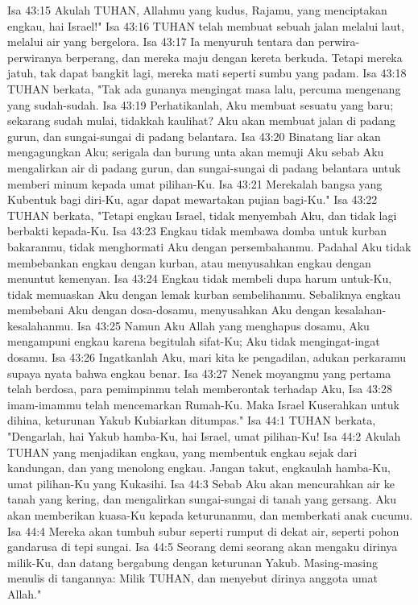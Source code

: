 Isa 43:15  Akulah TUHAN, Allahmu yang kudus, Rajamu, yang menciptakan engkau, hai Israel!"
Isa 43:16  TUHAN telah membuat sebuah jalan melalui laut, melalui air yang bergelora.
Isa 43:17  Ia menyuruh tentara dan perwira-perwiranya berperang, dan mereka maju dengan kereta berkuda. Tetapi mereka jatuh, tak dapat bangkit lagi, mereka mati seperti sumbu yang padam.
Isa 43:18  TUHAN berkata, "Tak ada gunanya mengingat masa lalu, percuma mengenang yang sudah-sudah.
Isa 43:19  Perhatikanlah, Aku membuat sesuatu yang baru; sekarang sudah mulai, tidakkah kaulihat? Aku akan membuat jalan di padang gurun, dan sungai-sungai di padang belantara.
Isa 43:20  Binatang liar akan mengagungkan Aku; serigala dan burung unta akan memuji Aku sebab Aku mengalirkan air di padang gurun, dan sungai-sungai di padang belantara untuk memberi minum kepada umat pilihan-Ku.
Isa 43:21  Merekalah bangsa yang Kubentuk bagi diri-Ku, agar dapat mewartakan pujian bagi-Ku."
Isa 43:22  TUHAN berkata, "Tetapi engkau Israel, tidak menyembah Aku, dan tidak lagi berbakti kepada-Ku.
Isa 43:23  Engkau tidak membawa domba untuk kurban bakaranmu, tidak menghormati Aku dengan persembahanmu. Padahal Aku tidak membebankan engkau dengan kurban, atau menyusahkan engkau dengan menuntut kemenyan.
Isa 43:24  Engkau tidak membeli dupa harum untuk-Ku, tidak memuaskan Aku dengan lemak kurban sembelihanmu. Sebaliknya engkau membebani Aku dengan dosa-dosamu, menyusahkan Aku dengan kesalahan-kesalahanmu.
Isa 43:25  Namun Aku Allah yang menghapus dosamu, Aku mengampuni engkau karena begitulah sifat-Ku; Aku tidak mengingat-ingat dosamu.
Isa 43:26  Ingatkanlah Aku, mari kita ke pengadilan, adukan perkaramu supaya nyata bahwa engkau benar.
Isa 43:27  Nenek moyangmu yang pertama telah berdosa, para pemimpinmu telah memberontak terhadap Aku,
Isa 43:28  imam-imammu telah mencemarkan Rumah-Ku. Maka Israel Kuserahkan untuk dihina, keturunan Yakub Kubiarkan ditumpas."
Isa 44:1  TUHAN berkata, "Dengarlah, hai Yakub hamba-Ku, hai Israel, umat pilihan-Ku!
Isa 44:2  Akulah TUHAN yang menjadikan engkau, yang membentuk engkau sejak dari kandungan, dan yang menolong engkau. Jangan takut, engkaulah hamba-Ku, umat pilihan-Ku yang Kukasihi.
Isa 44:3  Sebab Aku akan mencurahkan air ke tanah yang kering, dan mengalirkan sungai-sungai di tanah yang gersang. Aku akan memberikan kuasa-Ku kepada keturunanmu, dan memberkati anak cucumu.
Isa 44:4  Mereka akan tumbuh subur seperti rumput di dekat air, seperti pohon gandarusa di tepi sungai.
Isa 44:5  Seorang demi seorang akan mengaku dirinya milik-Ku, dan datang bergabung dengan keturunan Yakub. Masing-masing menulis di tangannya: Milik TUHAN, dan menyebut dirinya anggota umat Allah."
